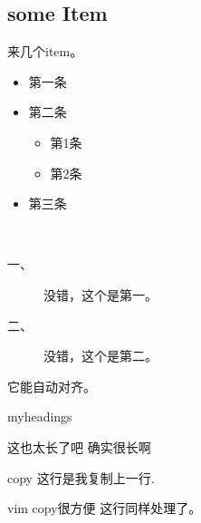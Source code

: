 \documentclass{scrartcl}
\begin{document}
\begin{CJK}{UTF8}{gbsn}
\begin{minipage}[h]{0.4\linewidth}
\begin{flushleft}

\subsection{some Item}
来几个item。

\begin{itemize}
	\item 第一条
	\item 第二条
		\begin{itemize}
			\item 第1条
			\item 第2条
		\end{itemize}
	\item 第三条
\end{itemize}

\end{flushleft}
\end{minipage}
\begin{minipage}[h]{0.5\linewidth}
\begin{flushright}

~\\
\begin{description}
	\item[一、] 没错，这个是第一。
	\item[二、] 没错，这个是第二。
\end{description}

它能自动对齐。\\
\begin{labeling}[~~---~]{myheadings}
	\item[\usekomafont{descriptionlabel}这也太长了吧]
		确实很长啊
	\item[\usekomafont{descriptionlabel}copy]
		这行是我复制上一行.
	\item[\usekomafont{descriptionlabel}vim copy很方便]
		这行同样处理了。
\end{labeling}

\end{flushright}
\end{minipage}


\clearpage\end{CJK}
\end{document}
